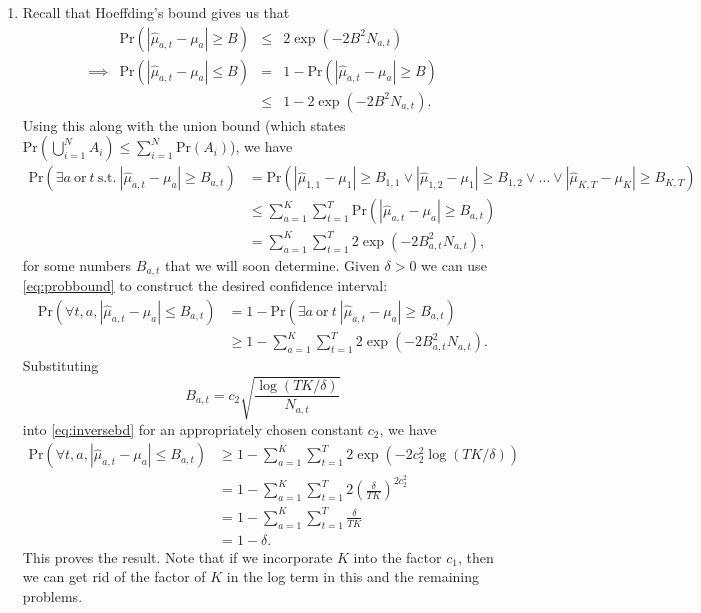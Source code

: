 \documentclass{article}
\newcommand{\pr}[1]{\text{Pr}\left(#1\right)}
\begin{document}
\begin{enumerate}
	\item Recall that Hoeffding's bound gives us that
	\begin{equation}
	\begin{array}{crcl}
		& \pr{|\hat \mu_{a,t}-\mu_a|\geq B} & \leq & 2\exp(-2B^2 N_{a,t})\\
		\implies & \pr{|\hat \mu_{a,t}-\mu_a|\leq B} & = & 1 - \pr{|\hat \mu_{a,t}-\mu_a|\geq B}\\
		& & \leq & 1 - 2\exp(-2B^2N_{a,t}).
	\end{array}
	\end{equation}
	Using this along with the union bound (which states $\pr{\bigcup_{i=1}^NA_i}\leq\sum_{i=1}^N\pr{A_i}$), we have
	\begin{align}
		\pr{\exists a~\text{or}~t~\text{s.t.}~ |\hat \mu_{a,t}-\mu_a| \geq B_{a,t} } &= \pr{|\hat \mu_{1,1}-\mu_1|\geq B_{1,1}\vee |\hat \mu_{1,2}-\mu_1|\geq B_{1,2} \vee \dots \vee |\hat \mu_{K,T}-\mu_K|\geq B_{K,T}}\\
		&\leq\sum_{a=1}^K\sum_{t=1}^T\pr{|\hat \mu_{a,t}-\mu_a|\geq B_{a,t}}\\
		&= \sum_{a=1}^K\sum_{t=1}^T2\exp(-2B_{a,t}^2N_{a,t}),\label{eq:probbound}
	\end{align}
	for some numbers $B_{a,t}$ that we will soon determine.
	Given $\delta>0$ we can use \eqref{eq:probbound} to construct the desired confidence interval:
	\begin{align}
		\pr{\forall t,a,|\hat\mu_{a,t}-\mu_a|\leq B_{a,t}}&= 1 - \pr{\exists a~\text{or}~t ~ |\hat \mu_{a,t}-\mu_a| \geq B_{a,t} }\\
		&\geq 1 - \sum_{a=1}^K\sum_{t=1}^T2\exp(-2B_{a,t}^2N_{a,t}).\label{eq:inversebd}
	\end{align}
	Substituting
	\begin{equation}
		B_{a,t}=c_2\sqrt{\frac{\log(TK/\delta)}{N_{a,t}}}
	\end{equation}
	into \eqref{eq:inversebd} for an appropriately chosen constant $c_2$, we have
	\begin{align}
		\pr{\forall t,a, |\hat\mu_{a,t}-\mu_a|\leq B_{a,t}} &\geq 1 - \sum_{a=1}^K\sum_{t=1}^T2\exp\left(-2c_2^2\log(TK/\delta)\right)\\
		&=1 - \sum_{a=1}^K\sum_{t=1}^T2\left(\frac{\delta}{TK}\right)^{2c_2^2}\\
		&=1 - \sum_{a=1}^K\sum_{t=1}^T\frac{\delta}{TK}\\
		&=1 - \delta.
	\end{align}
	This proves the result. Note that if we incorporate $K$ into the factor $c_1$, then we can get rid of the factor of $K$ in the log term in this and the remaining problems.


\end{enumerate}
\end{document}
